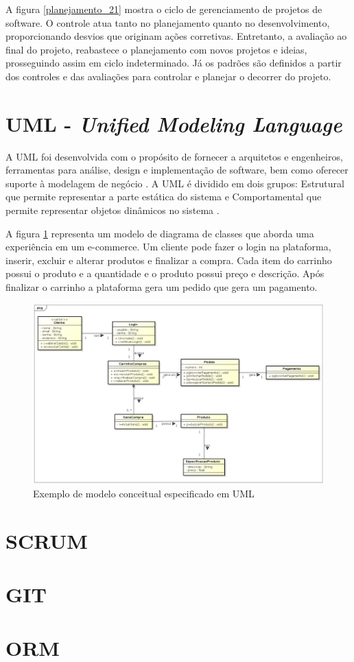 A figura \ref{planejamento_21} mostra o ciclo de gerenciamento de projetos de software. O controle atua tanto no planejamento quanto no desenvolvimento, proporcionando desvios que originam ações corretivas. Entretanto, a avaliação ao final do projeto, reabastece o planejamento com novos projetos e ideias, prosseguindo assim em ciclo indeterminado. Já os padrões são definidos a partir dos controles e das avaliações para controlar e planejar o decorrer do projeto.


\section{UML - \textit{Unified Modeling Language}}
A UML foi desenvolvida com o propósito de fornecer a
arquitetos e engenheiros, ferramentas para análise, design e implementação de software, bem
como oferecer suporte à modelagem de negócio \cite{gasparini2018driv}. A UML é dividido em dois grupos: Estrutural que permite representar a parte estática do sistema e Comportamental que permite representar objetos dinâmicos no sistema \cite{silva2018sasml}.

A figura \ref{Exemplo_UML} representa um modelo de diagrama de classes que aborda uma experiência em um e-commerce. Um cliente pode fazer o login na plataforma, inserir, excluir e alterar produtos e finalizar a compra. Cada item do carrinho possui o produto e a quantidade e o produto possui preço e descrição.
Após finalizar o carrinho a plataforma gera um pedido que gera um pagamento.
\begin{figure}[htb]
	\caption{\label{Exemplo_UML} Exemplo de modelo conceitual especificado em UML}
	\begin{center}
		\includegraphics[scale=0.45]{./Figuras/Exemplo_UML.png}
	\end{center}
\end{figure}

\section{SCRUM}

\section{GIT}

\section{ORM}